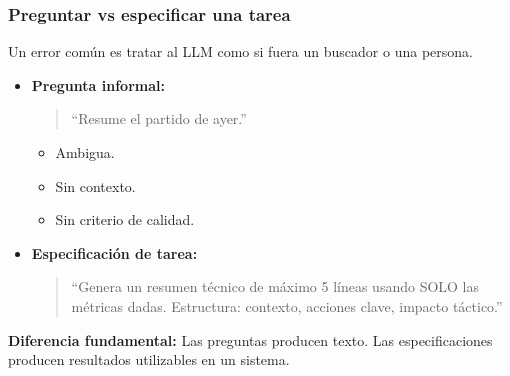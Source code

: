 \documentclass[aspectratio=169]{beamer}
\begin{document}
\begin{frame}\frametitle{Preguntar vs especificar una tarea}

Un error común es tratar al LLM como si fuera un buscador o una persona.

\vspace{0.4em}

\begin{itemize}
    \item \textbf{Pregunta informal:}
    \begin{quote}
    “Resume el partido de ayer.”
    \end{quote}
    \begin{itemize}
        \item Ambigua.
        \item Sin contexto.
        \item Sin criterio de calidad.
    \end{itemize}

    \vspace{0.4em}

    \item \textbf{Especificación de tarea:}
    \begin{quote}
    “Genera un resumen técnico de máximo 5 líneas usando SOLO las métricas dadas.  
    Estructura: contexto, acciones clave, impacto táctico.”
    \end{quote}
\end{itemize}

\vspace{0.4em}
\textbf{Diferencia fundamental:}  
Las preguntas producen texto.  
Las especificaciones producen resultados utilizables en un sistema.
\end{frame}
\end{document}
